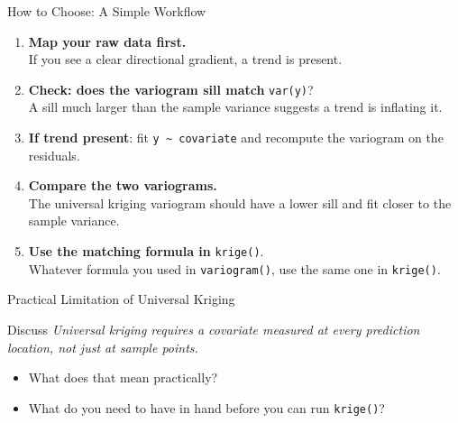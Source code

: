 \documentclass[aspectratio=169, 12pt]{beamer}
\begin{document}
\begin{frame}{How to Choose: A Simple Workflow}
  \begin{enumerate}
    \setlength\itemsep{0.7em}
    \item \textbf{Map your raw data first.} \\
      \small If you see a clear directional gradient, a trend is present.
    \item \textbf{Check: does the variogram sill match} \texttt{var(y)}? \\
      \small A sill much larger than the sample variance suggests a trend is inflating it.
    \item \textbf{If trend present}: fit \texttt{y \textasciitilde{} covariate} and recompute the variogram on the residuals.
    \item \textbf{Compare the two variograms.} \\
      \small The universal kriging variogram should have a lower sill and fit closer to the sample variance.
    \item \textbf{Use the matching formula in} \texttt{krige()}. \\
      \small Whatever formula you used in \texttt{variogram()}, use the same one in \texttt{krige()}.
  \end{enumerate}
\end{frame}

\begin{frame}{Practical Limitation of Universal Kriging}

\begin{alertblock}{Discuss}
    \itshape Universal kriging requires a covariate measured at every
    prediction location, not just at sample points. 
    \begin{itemize}
    \item What does that mean practically? 
    \item What do you need to have in hand before you can run  \texttt{krige()}?
    \end{itemize}
  \end{alertblock}
\end{frame}
\end{document}
